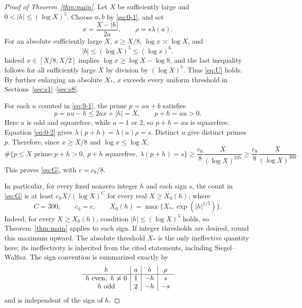 \documentclass[11pt]{article}
\theoremstyle{definition}
\theoremstyle{definition}
\begin{document}
\begin{proof}[Proof of Theorem~\ref{thm:main}]
Let \(X\) be sufficiently large and \(0<|h|\le(\log X)^5\). Choose \(a,b\) by \eqref{eq:0-1}, and set
\begin{equation}
x=\frac{X-|h|}{2a},\qquad \rho=s\lambda(a).             \tag{9.2}\label{eq:9-2}
\end{equation}
For an absolute sufficiently large \(X\), \(x\ge X/8\), \(\log x\asymp\log X\), and
\begin{equation*}
|b|\le(\log X)^5\le(\log x)^6.
\end{equation*}
Indeed \(x\in[X/8,X/2]\) implies \(\log x\ge\log X-\log8\), and the last inequality follows for all sufficiently large \(X\) by division by \((\log X)^5\). Thus \eqref{eq:U} holds. By further enlarging an absolute \(X_*\), \(x\) exceeds every uniform threshold in Sections~\ref{sec:s1}--\ref{sec:s8}.

For each \(u\) counted in \eqref{eq:9-1}, the prime \(p=au+b\) satisfies
\begin{equation*}
p=au-h\le2ax+|h|=X,\qquad p+h=au>0.
\end{equation*}
Here \(u\) is odd and squarefree, while \(a=1\) or \(2\), so \(p+h=au\) is squarefree. Equation \eqref{eq:0-2} gives \(\lambda(p+h)=\lambda(a)\rho=s\). Distinct \(u\) give distinct primes \(p\). Therefore, since \(x\ge X/8\) and \(\log x\le\log X\),
\begin{equation*}
\#\{p\le X\text{ prime}:p+h>0,\ p+h\text{ squarefree},\ \lambda(p+h)=s\}
 \ge \frac{c_9}{8}\frac{X}{(\log X)^{225}}
 \ge \frac{c_9}{8}\frac{X}{(\log X)^{300}}.
\end{equation*}
This proves \eqref{eq:G}, with \(c=c_9/8\). 

In particular, for every fixed nonzero integer \(h\) and each sign \(s\), the count in \eqref{eq:G} is at least \(c_hX/(\log X)^{C}\) for every real \(X\ge X_0(h)\), where
\begin{equation}
C=300,\qquad c_h=c,\qquad
 X_0(h)=\max\{X_*,\exp(|h|^{1/5})\}.                    \tag{9.3}\label{eq:9-3}
\end{equation}
Indeed, for every \(X\ge X_0(h)\), condition \(|h|\le(\log X)^5\) holds, so Theorem~\ref{thm:main} applies to each sign. If integer thresholds are desired, round this maximum upward. The absolute threshold \(X_*\) is the only ineffective quantity here; its ineffectivity is inherited from the cited statements, including Siegel--Walfisz. The sign convention is summarized exactly by
\begin{equation*}
\begin{array}{c|c|c|c}
 h & a & b & \rho\\ \hline
 h\ {\rm even},\ h\ne0 &1&-h&s\\
 h\ {\rm odd} &2&-h&-s
 \end{array}
\end{equation*}
and is independent of the sign of \(h\). 


\end{proof}
\end{document}
